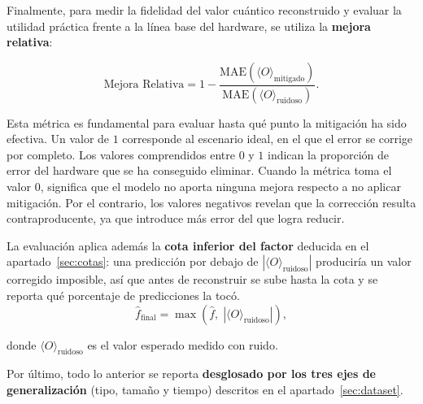 Finalmente, para medir la fidelidad del valor cuántico reconstruido y evaluar la utilidad práctica frente a la línea base del hardware, se utiliza la \textbf{mejora relativa}:

\begin{equation}
\label{eq:mejora_relativa}
\text{Mejora Relativa} = 1 - \frac{\text{MAE}(\langle O\rangle_{\text{mitigado}})}
                                  {\text{MAE}(\langle O\rangle_{\text{ruidoso}})} .
\end{equation}

Esta métrica es fundamental para evaluar hasta qué punto la mitigación ha sido efectiva. Un valor de $1$ corresponde al escenario ideal, en el que el error se corrige por completo. Los valores comprendidos entre $0$ y $1$ indican la proporción de error del hardware que se ha conseguido eliminar. Cuando la métrica toma el valor $0$, significa que el modelo no aporta ninguna mejora respecto a no aplicar mitigación. Por el contrario, los valores negativos revelan que la corrección resulta contraproducente, ya que introduce más error del que logra reducir.

\label{sec:cota}%
La evaluación aplica además la \textbf{cota inferior del factor} deducida en el
apartado~\ref{sec:cotas}: una predicción por debajo de $|\langle O\rangle_{\text{ruidoso}}|$ produciría un valor corregido
imposible, así que antes de reconstruir se sube hasta la cota y se reporta qué porcentaje de
predicciones la tocó.
\begin{equation}
\label{eq:cota}
\hat f_{\text{final}} = \max\left(\hat f,\; |\langle O\rangle_{\text{ruidoso}}|\right),
\end{equation}

\noindent donde $\langle O\rangle_{\text{ruidoso}}$ es el valor esperado medido con ruido.

\label{sec:reportar}%
Por último, todo lo anterior se reporta \textbf{desglosado por los tres ejes de
generalización} (tipo, tamaño y tiempo) descritos en el apartado~\ref{sec:dataset}. 
